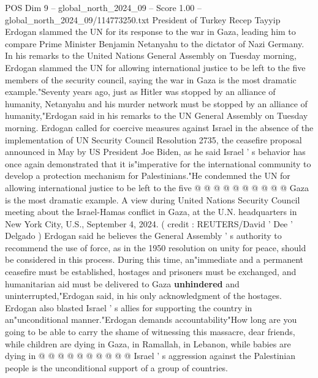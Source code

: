 \begin{textsample}{POS Dim 9 – global\_north\_2024\_09 – Score 1.00 – global\_north\_2024\_09/114773250.txt}  \label{ex:f9_pos_246}
President of Turkey Recep Tayyip Erdogan slammed the UN for its response to the war in Gaza, leading him to compare Prime Minister Benjamin Netanyahu to the dictator of Nazi Germany.
In his remarks to the United Nations General Assembly on Tuesday morning, Erdogan slammed the UN for allowing international justice to be left to the five members of the security council, saying the war in Gaza is the most dramatic example."Seventy years ago, just as Hitler was stopped by an alliance of humanity, Netanyahu and his murder network must be stopped by an alliance of humanity,"Erdogan said in his remarks to the UN General Assembly on Tuesday morning.
Erdogan called for coercive measures against Israel in the absence of the implementation of UN Security Council Resolution 2735, the ceasefire proposal announced in May by US President Joe Biden, as he said Israel ' s behavior has once again demonstrated that it is"imperative for the international community to develop a protection mechanism for Palestinians."He condemned the UN for allowing international justice to be left to the five @ @ @ @ @ @ @ @ @ @ Gaza is the most dramatic example.
A view during United Nations Security Council meeting about the Israel-Hamas conflict in Gaza, at the U.N. headquarters in New York City, U.S., September 4, 2024. ( credit : REUTERS/David ' Dee ' Delgado ) Erdogan said he believes the General Assembly ' s authority to recommend the use of force, as in the 1950 resolution on unity for peace, should be considered in this process.
During this time, an"immediate and a permanent ceasefire must be established, hostages and prisoners must be exchanged, and humanitarian aid must be delivered to Gaza \textbf{unhindered} and uninterrupted,"Erdogan said, in his only acknowledgment of the hostages.
Erdogan also blasted Israel ' s allies for supporting the country in an"unconditional manner."Erdogan demands accountability"How long are you going to be able to carry the shame of witnessing this massacre, dear friends, while children are dying in Gaza, in Ramallah, in Lebanon, while babies are dying in @ @ @ @ @ @ @ @ @ @ Israel ' s aggression against the Palestinian people is the unconditional support of a group of countries.

\end{textsample}
